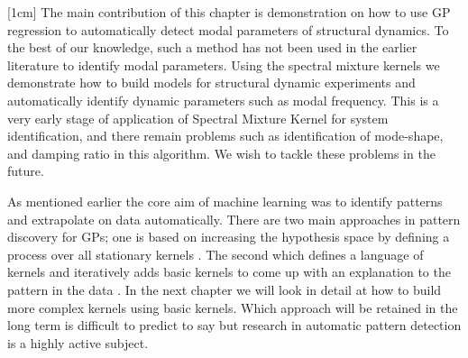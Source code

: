 [1cm]
The main contribution of this chapter is demonstration on how to use GP regression to automatically detect modal parameters of structural dynamics. To the best of our knowledge, such a method has not been used in the earlier literature to identify modal parameters. Using the spectral mixture kernels we demonstrate how to build models for structural dynamic experiments and automatically identify dynamic parameters such as modal frequency. This is a very early stage of application of Spectral Mixture Kernel for system identification, and there remain problems such as identification of mode-shape, and damping ratio in this algorithm. We wish to tackle these problems in the future. 

As mentioned earlier the core aim of machine learning was to identify patterns and extrapolate on data automatically. There are two main approaches in pattern discovery for GPs; one is based on increasing the hypothesis space by defining a process over all stationary kernels \cite{wilson2012process}. The second which defines a language of kernels and iteratively adds basic kernels to come up with an explanation to the pattern in the data \cite{lloyd2014automatic}. In the next chapter we will look in detail at how to build more complex kernels using basic kernels. Which approach will be retained in the long term is difficult to predict to say but research in automatic pattern detection is a highly active subject. 


